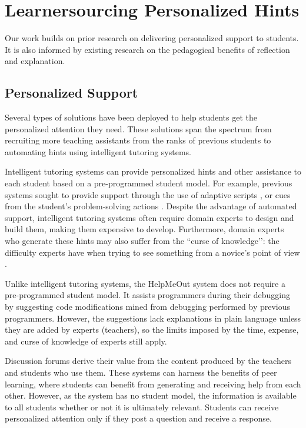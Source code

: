 \section{Learnersourcing Personalized Hints}

Our work builds on prior research on delivering personalized support to students. It is also informed by existing research on the pedagogical benefits of reflection and explanation.

\subsection{Personalized Support}

Several types of solutions have been deployed to help students get the personalized attention they need. These solutions span the spectrum from recruiting more teaching assistants from the ranks of previous students \cite{communityTAs} to automating hints using intelligent tutoring systems. 

Intelligent tutoring systems can provide personalized hints and other assistance to each student based on a pre-programmed student model. For example, previous systems sought to provide support through the use of adaptive scripts \cite{kumar2007tutorial}, or cues from the student’s problem-solving actions \cite{diziol}. Despite the advantage of automated support, intelligent tutoring systems often require domain experts to design and build them, making them expensive to develop. Furthermore, domain experts who generate these hints may also suffer from the ``curse of knowledge’’: the difficulty experts have when trying to see something from a novice’s point of view \cite{curse}. 

Unlike intelligent tutoring systems, the HelpMeOut system \cite{helpmeout} does not require a pre-programmed student model. It assists programmers during their debugging by suggesting code modifications mined from debugging performed by previous programmers. However, the suggestions lack explanations in plain language unless they are added by experts (teachers), so the limits imposed by the time, expense, and curse of knowledge of experts still apply.

Discussion forums derive their value from the content produced by the teachers and students who use them. These systems can harness the benefits of peer learning, where students can benefit from generating and receiving help from each other. However, as the system has no student model, the information is available to all students whether or not it is ultimately relevant. Students can receive personalized attention only if they post a question and receive a response. 

